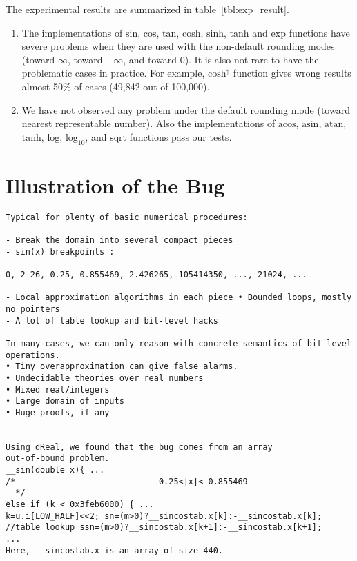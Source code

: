 \documentclass{llncs}
\newcommand{\rup}[1]{\ensuremath{\mathrm{#1}^{\uparrow}}}
\begin{document}
The experimental results are summarized in table~\ref{tbl:exp_result}.
\begin{enumerate}
\item The implementations of $\mathrm{sin}$, $\mathrm{cos}$,
  $\mathrm{tan}$, $\mathrm{cosh}$, $\mathrm{sinh}$, $\mathrm{tanh}$
  and $\mathrm{exp}$ functions have severe problems when they are used
  with the non-default rounding modes (toward $\infty$, toward
  $-\infty$, and toward $0$). It is also not rare to have the
  problematic cases in practice. For example, $\rup{cosh}$ function
  gives wrong results almost 50\% of cases (49,842 out of 100,000).
\item We have not observed any problem under the default rounding mode
  (toward nearest representable number). Also the implementations of
  $\mathrm{acos}$, $\mathrm{asin}$, $\mathrm{atan}$, $\mathrm{tanh}$,
  $\mathrm{log}$, $\mathrm{log_{10}}$, and $\mathrm{sqrt}$ functions pass
  our tests.
\end{enumerate}

\section{Illustration of the Bug}



\begin{Verbatim}
Typical for plenty of basic numerical procedures:

- Break the domain into several compact pieces
- sin(x) breakpoints :

0, 2−26, 0.25, 0.855469, 2.426265, 105414350, ..., 21024, ...

- Local approximation algorithms in each piece • Bounded loops, mostly no pointers
- A lot of table lookup and bit-level hacks

In many cases, we can only reason with concrete semantics of bit-level operations.
• Tiny overapproximation can give false alarms.
• Undecidable theories over real numbers
• Mixed real/integers
• Large domain of inputs
• Huge proofs, if any


Using dReal, we found that the bug comes from an array
out-of-bound problem.
__sin(double x){ ...
/*---------------------------- 0.25<|x|< 0.855469---------------------- */
else if (k < 0x3feb6000) { ...
k=u.i[LOW_HALF]<<2; sn=(m>0)?__sincostab.x[k]:-__sincostab.x[k]; //table lookup ssn=(m>0)?__sincostab.x[k+1]:-__sincostab.x[k+1];
...
Here,   sincostab.x is an array of size 440.



\end{Verbatim}
\end{document}
